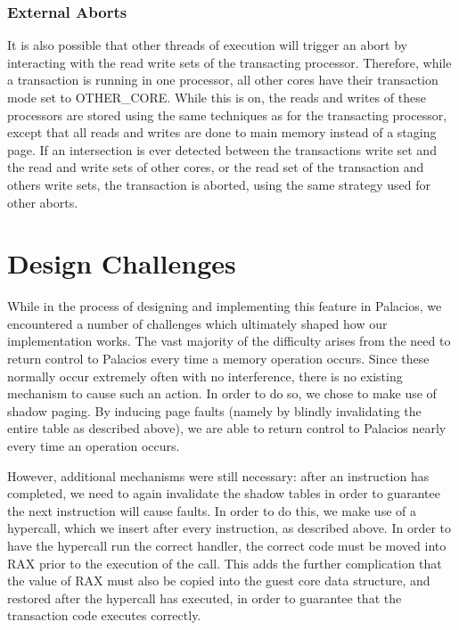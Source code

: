 \documentclass{acm_proc_article-sp}
\begin{document}
\subsubsection{External Aborts}

It is also possible that other threads of execution will trigger an abort by
interacting with the read write sets of the transacting processor. Therefore,
while a transaction is running in one processor, all other cores have their
transaction mode set to OTHER\_CORE. While this is on, the reads and writes of these
processors are stored using the same techniques as for the transacting
processor, except that all reads and writes are done to main memory instead of
a staging page. If an intersection is ever detected between the transactions
write set and the read and write sets of other cores, or the read set of the
transaction and others write sets, the transaction is aborted, using the same
strategy used for other aborts.  

\section{Design Challenges}

While in the process of designing and implementing this feature in Palacios, we
encountered a number of challenges which ultimately shaped how our implementation
works. The vast majority of the difficulty arises from the need to return
control to Palacios every time a memory operation occurs. Since these normally
occur extremely often with no interference, there is no existing mechanism to 
cause such an action. In order to do so, we chose to make use of shadow paging.
By inducing page faults (namely by blindly invalidating the entire table as
described above), we are able to return control to Palacios nearly every time
an operation occurs.

However, additional mechanisms were still necessary: after an instruction has
completed, we need to again invalidate the shadow tables in order to guarantee 
the next instruction will cause faults. In order to do this, we make use of a 
hypercall, which we insert after every instruction, as described above. In order
to have the hypercall run the correct handler, the correct code must be moved
into RAX prior to the execution of the call. This adds the further complication
that the value of RAX must also be copied into the guest core data structure,
and restored after the hypercall has executed, in order to guarantee that the 
transaction code executes correctly.  
\end{document}
